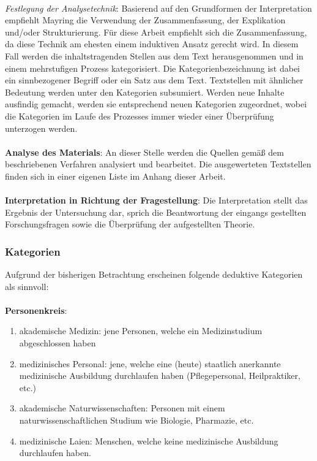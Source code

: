 \documentclass[
    a4paper,
    12pt,
    hyphens,
    chapterprefix=true,
    headheight=33pt,
    footheight=29pt,
    headings=optiontohead, %
]{scrartcl}
\begin{document}
\\
\textit{Festlegung der Analysetechnik}: Basierend auf den Grundformen der Interpretation empfiehlt Mayring die Verwendung der Zusammenfassung, der Explikation und/oder Strukturierung. Für diese Arbeit empfiehlt sich die Zusammenfassung, da diese Technik am ehesten einem induktiven Ansatz gerecht wird. In diesem Fall werden die inhaltstragenden Stellen aus dem Text herausgenommen und in einem mehrstufigen Prozess kategorisiert. Die Kategorienbezeichnung ist dabei ein sinnbezogener Begriff oder ein Satz aus dem Text. Textstellen mit ähnlicher Bedeutung werden unter den Kategorien subsumiert. Werden neue Inhalte ausfindig gemacht, werden sie entsprechend neuen Kategorien zugeordnet, wobei die Kategorien im Laufe des Prozesses immer wieder einer Überprüfung unterzogen werden.\\
\\
\textbf{Analyse des Materials}: An dieser Stelle werden die Quellen gemäß dem beschriebenen Verfahren analysiert und bearbeitet. Die ausgewerteten Textstellen finden sich in einer eigenen Liste im Anhang dieser Arbeit.\\
\\
\textbf{Interpretation in Richtung der Fragestellung}: Die Interpretation stellt das Ergebnis der Untersuchung dar, sprich die Beantwortung der eingangs gestellten Forschungsfragen sowie die Überprüfung der aufgestellten Theorie.

\subsubsection{Kategorien}
Aufgrund der bisherigen Betrachtung erscheinen folgende deduktive Kategorien als sinnvoll:\\
\\
\textbf{Personenkreis}:
\begin{enumerate}
	\item{akademische Medizin: jene Personen, welche ein Medizinstudium abgeschlossen haben}
  \item{medizinisches Personal: jene, welche eine (heute) staatlich anerkannte medizinische Ausbildung durchlaufen haben (Pflegepersonal, Heilpraktiker, etc.)}
  \item{akademische Naturwissenschaften: Personen mit einem naturwissenschaftlichen Studium wie Biologie, Pharmazie, etc.}
  \item{medizinische Laien: Menschen, welche keine medizinische Ausbildung durchlaufen haben.}
\end{enumerate}
\end{document}
